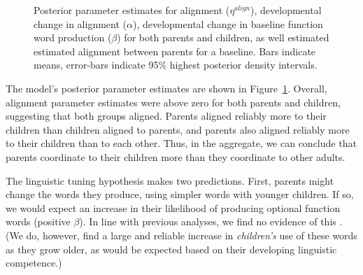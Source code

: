 \documentclass[10pt,letterpaper]{article}
\begin{document}
\begin{figure}[b]
  \caption{\label{fig:model_parameters} Posterior parameter estimates for alignment ($\eta^{align}$), developmental change in alignment ($\alpha$), developmental change in baseline function word production ($\beta$) for both parents and children, as well estimated estimated alignment between parents for a baseline. Bars indicate means, error-bars indicate  95\% highest posterior density intervals.}
\end{figure}


The model's posterior parameter estimates are shown in  Figure~\ref{fig:model_parameters}. Overall, alignment parameter estimates were above zero for both parents and children, suggesting that both groups aligned. Parents aligned reliably more to their children than children aligned to parents, and parents also aligned reliably more to their children than to each other. Thus, in the aggregate, we can conclude that parents coordinate to their children more than they coordinate to other adults.

The linguistic tuning hypothesis makes two predictions. First, parents might change the words they produce, using simpler words with younger children. If so, we would expect an increase in their likelihood of producing optional function words (positive $\beta$). In line with previous analyses, we find no evidence of this \cite{newport1977, hayes1988}. (We do, however, find a large and reliable increase in \emph{children's} use of these words as they grow older, as would be expected based on their developing linguistic competence.)
\end{document}
